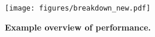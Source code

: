 \begin{figure}[!t]
    \centering
    \texttt{[image: figures/breakdown\_new.pdf]}      \caption{\textbf{Example overview of performance.} 
}
        \label{fig:breakdown}
\end{figure}
